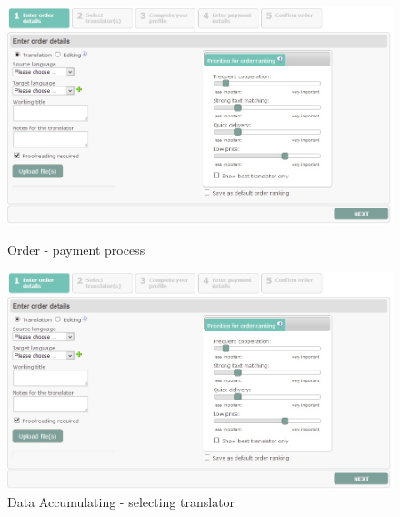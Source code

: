 \begin{figure}[h]
\begin{center}
\includegraphics[scale=\figurescaling]{figures/order-1.jpg}
\caption{Order - payment process
\label{fig:order-3}}
\includegraphics[scale=\figurescaling]{figures/order-1.jpg}
\caption{Data Accumulating - selecting translator
\label{fig:dataaccumulating}}
\end{center}
\end{figure}


